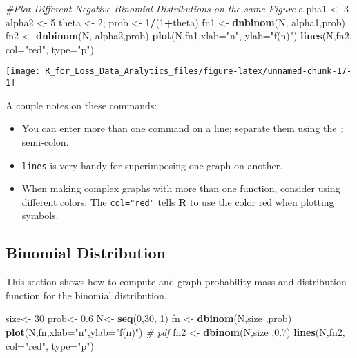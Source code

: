 \documentclass[]{book}
\newenvironment{Shaded}{\begin{snugshade}}{\end{snugshade}}
\newcommand{\KeywordTok}[1]{\textcolor[rgb]{0.13,0.29,0.53}{\textbf{#1}}}
\newcommand{\DataTypeTok}[1]{\textcolor[rgb]{0.13,0.29,0.53}{#1}}
\newcommand{\DecValTok}[1]{\textcolor[rgb]{0.00,0.00,0.81}{#1}}
\newcommand{\FloatTok}[1]{\textcolor[rgb]{0.00,0.00,0.81}{#1}}
\newcommand{\StringTok}[1]{\textcolor[rgb]{0.31,0.60,0.02}{#1}}
\newcommand{\CommentTok}[1]{\textcolor[rgb]{0.56,0.35,0.01}{\textit{#1}}}
\newcommand{\OperatorTok}[1]{\textcolor[rgb]{0.81,0.36,0.00}{\textbf{#1}}}
\newcommand{\NormalTok}[1]{#1}
\providecommand{\tightlist}{%
  \setlength{\itemsep}{0pt}\setlength{\parskip}{0pt}}
\theoremstyle{definition}
\theoremstyle{definition}
\theoremstyle{definition}
\theoremstyle{remark}
\begin{document}
\begin{Shaded}
\begin{Highlighting}[]
\CommentTok{#Plot Different Negative Binomial Distributions on the same Figure}
\NormalTok{alpha1 <-}\StringTok{ }\DecValTok{3}
\NormalTok{alpha2 <-}\StringTok{ }\DecValTok{5}
\NormalTok{theta <-}\StringTok{ }\DecValTok{2}\NormalTok{; prob <-}\StringTok{ }\DecValTok{1}\OperatorTok{/}\NormalTok{(}\DecValTok{1}\OperatorTok{+}\NormalTok{theta)}
\NormalTok{fn1 <-}\StringTok{ }\KeywordTok{dnbinom}\NormalTok{(N, alpha1,prob)}
\NormalTok{fn2 <-}\StringTok{ }\KeywordTok{dnbinom}\NormalTok{(N, alpha2,prob)}
\KeywordTok{plot}\NormalTok{(N,fn1,}\DataTypeTok{xlab=}\StringTok{"n"}\NormalTok{, }\DataTypeTok{ylab=}\StringTok{"f(n)"}\NormalTok{)}
\KeywordTok{lines}\NormalTok{(N,fn2, }\DataTypeTok{col=}\StringTok{"red"}\NormalTok{, }\DataTypeTok{type=}\StringTok{"p"}\NormalTok{)}
\end{Highlighting}
\end{Shaded}

\begin{center}\texttt{[image: R\_for\_Loss\_Data\_Analytics\_files/figure-latex/unnamed-chunk-17-1]} \end{center}

A couple notes on these commands:

\begin{itemize}
\tightlist
\item
  You can enter more than one command on a line; separate them using the
  \texttt{;} semi-colon.
\item
  \texttt{lines} is very handy for superimposing one graph on another.
\item
  When making complex graphs with more than one function, consider using
  different colors. The \texttt{col="red"} tells \textbf{R} to use the
  color red when plotting symbols.
\end{itemize}

\subsection{Binomial Distribution}\label{binomial-distribution}

This section shows how to compute and graph probability mass and
distribution function for the binomial distribution.

\begin{Shaded}
\begin{Highlighting}[]
\NormalTok{size<-}\StringTok{ }\DecValTok{30}
\NormalTok{prob<-}\StringTok{ }\FloatTok{0.6}
\NormalTok{N<-}\StringTok{ }\KeywordTok{seq}\NormalTok{(}\DecValTok{0}\NormalTok{,}\DecValTok{30}\NormalTok{, }\DecValTok{1}\NormalTok{)}
\NormalTok{fn <-}\StringTok{ }\KeywordTok{dbinom}\NormalTok{(N,size ,prob)}
\KeywordTok{plot}\NormalTok{(N,fn,}\DataTypeTok{xlab=}\StringTok{"n"}\NormalTok{,}\DataTypeTok{ylab=}\StringTok{"f(n)"}\NormalTok{) }\CommentTok{# pdf}
\NormalTok{fn2 <-}\StringTok{ }\KeywordTok{dbinom}\NormalTok{(N,size ,}\FloatTok{0.7}\NormalTok{)}
\KeywordTok{lines}\NormalTok{(N,fn2, }\DataTypeTok{col=}\StringTok{"red"}\NormalTok{, }\DataTypeTok{type=}\StringTok{"p"}\NormalTok{)}
\end{Highlighting}
\end{Shaded}
\end{document}
